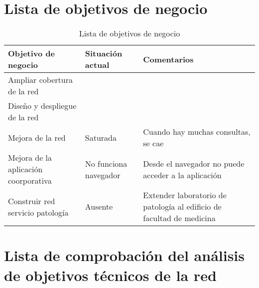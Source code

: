 \section{Lista de objetivos de negocio}

\begin{table}[H]
	\begin{center}
		\begin{tabular}{|l|l|l|}
			\hline 
			Objetivo de negocio & Situación actual & Comentarios \\ 
			\hline \hline
			Ampliar cobertura de la red &  & \\ \hline
			Diseño y despliegue de la red & & \\ \hline
			Mejora de la red & Saturada & Cuando hay muchas consultas, se cae \\ \hline
			Mejora de la aplicación coorporativa & No funciona navegador & Desde el navegador no puede acceder a la aplicación\\ \hline	
			Construir red servicio patología & Ausente & Extender laboratorio de patología al edificio de facultad de medicina\\ \hline	
		\end{tabular}
		\caption{Lista de objetivos de negocio}
		\label{tabla:tabla3}
	\end{center}
\end{table}

\section{Lista de comprobación del análisis de objetivos técnicos de la red}

